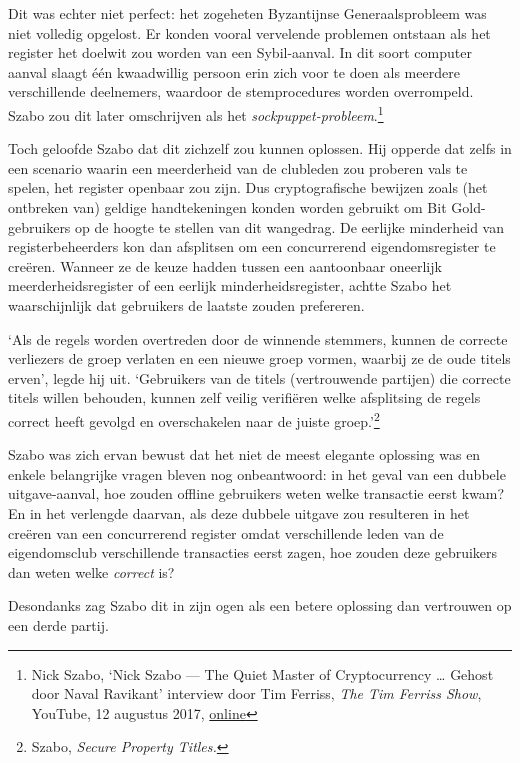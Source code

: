 \documentclass[
  a5paper,
  smalldemyvopaper,11pt,twoside,onecolumn,openright,extrafontsizes,
hidelinks]{memoir}
\begin{document}
Dit was echter niet perfect: het zogeheten Byzantijnse Generaalsprobleem
was niet volledig opgelost. Er konden vooral vervelende problemen
ontstaan als het register het doelwit zou worden van een Sybil-aanval.
In dit soort computer aanval slaagt één kwaadwillig persoon erin zich
voor te doen als meerdere verschillende deelnemers, waardoor de
stemprocedures worden overrompeld. Szabo zou dit later omschrijven als
het \emph{sockpuppet-probleem}.\footnote{Nick Szabo, `Nick Szabo --- The
  Quiet Master of Cryptocurrency \ldots{} Gehost door Naval Ravikant'
  interview door Tim Ferriss, \emph{The Tim Ferriss Show}, YouTube, 12
  augustus 2017,
  \href{https://www.youtube.com/watch?v=3FA3UjA0igY}{online}}

Toch geloofde Szabo dat dit zichzelf zou kunnen oplossen. Hij opperde
dat zelfs in een scenario waarin een meerderheid van de clubleden zou
proberen vals te spelen, het register openbaar zou zijn. Dus
cryptografische bewijzen zoals (het ontbreken van) geldige
handtekeningen konden worden gebruikt om Bit Gold-gebruikers op de
hoogte te stellen van dit wangedrag. De eerlijke minderheid van
registerbeheerders kon dan afsplitsen om een concurrerend
eigendomsregister te creëren. Wanneer ze de keuze hadden tussen een
aantoonbaar oneerlijk meerderheidsregister of een eerlijk
minderheidsregister, achtte Szabo het waarschijnlijk dat gebruikers de
laatste zouden prefereren.

`Als de regels worden overtreden door de winnende stemmers, kunnen de
correcte verliezers de groep verlaten en een nieuwe groep vormen,
waarbij ze de oude titels erven', legde hij uit. `Gebruikers van de
titels (vertrouwende partijen) die correcte titels willen behouden,
kunnen zelf veilig verifiëren welke afsplitsing de regels correct heeft
gevolgd en overschakelen naar de juiste groep.'\footnote{Szabo,
  \emph{Secure Property Titles.}}

Szabo was zich ervan bewust dat het niet de meest elegante oplossing was
en enkele belangrijke vragen bleven nog onbeantwoord: in het geval van
een dubbele uitgave-aanval, hoe zouden offline gebruikers weten welke
transactie eerst kwam? En in het verlengde daarvan, als deze dubbele
uitgave zou resulteren in het creëren van een concurrerend register
omdat verschillende leden van de eigendomsclub verschillende transacties
eerst zagen, hoe zouden deze gebruikers dan weten welke \emph{correct}
is?

Desondanks zag Szabo dit in zijn ogen als een betere oplossing dan
vertrouwen op een derde partij.
\end{document}
